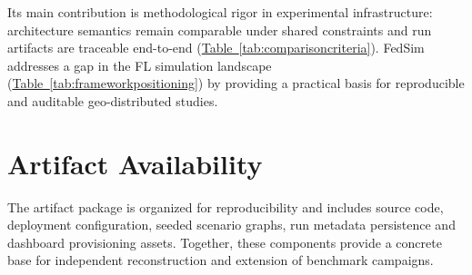 \documentclass[conference]{IEEEtran}
\newcommand{\tabref}[1]{\hyperref[#1]{Table~\ref*{#1}}}
\begin{document}
Its main contribution is methodological rigor in experimental infrastructure: architecture semantics remain comparable under shared constraints and run artifacts are traceable end-to-end (\tabref{tab:comparisoncriteria}). FedSim addresses a gap in the FL simulation landscape (\tabref{tab:frameworkpositioning}) by providing a practical basis for reproducible and auditable geo-distributed studies.

\section*{Artifact Availability}
The artifact package is organized for reproducibility and includes source code, deployment configuration, seeded scenario graphs, run metadata persistence and dashboard provisioning assets. Together, these components provide a concrete base for independent reconstruction and extension of benchmark campaigns.
\end{document}
